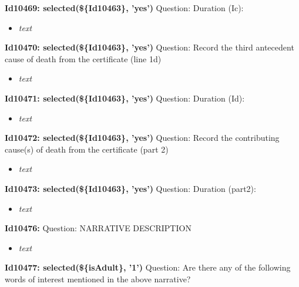 \documentclass{article}%
\begin{document}
\textbf{Id10469: selected(\$\{Id10463\}, 'yes')\newline%
}%
Question: Duration (Ic):\newline%
%
\begin{itemize}%
\item%
\textit{text\newline%
}%
\end{itemize}%
\textbf{Id10470: selected(\$\{Id10463\}, 'yes')\newline%
}%
Question: Record the third antecedent cause of death from the certificate (line 1d)\newline%
%
\begin{itemize}%
\item%
\textit{text\newline%
}%
\end{itemize}%
\textbf{Id10471: selected(\$\{Id10463\}, 'yes')\newline%
}%
Question: Duration (Id):\newline%
%
\begin{itemize}%
\item%
\textit{text\newline%
}%
\end{itemize}%
\textbf{Id10472: selected(\$\{Id10463\}, 'yes')\newline%
}%
Question: Record the contributing cause(s) of death from the certificate (part 2)\newline%
%
\begin{itemize}%
\item%
\textit{text\newline%
}%
\end{itemize}%
\textbf{Id10473: selected(\$\{Id10463\}, 'yes')\newline%
}%
Question: Duration (part2):\newline%
%
\begin{itemize}%
\item%
\textit{text\newline%
}%
\end{itemize}%
\textbf{Id10476: \newline%
}%
Question: NARRATIVE DESCRIPTION\newline%
%
\begin{itemize}%
\item%
\textit{text\newline%
}%
\end{itemize}%
\textbf{Id10477: selected(\$\{isAdult\}, '1')\newline%
}%
Question: Are there any of the following words of interest mentioned in the above narrative?\newline%
\end{document}
